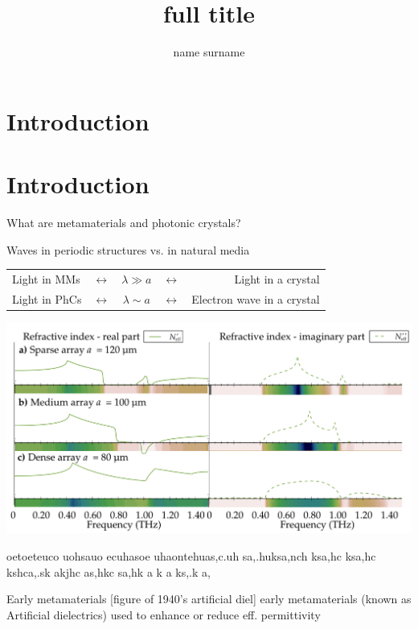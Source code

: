 \documentclass[t]{beamer} \usepackage[czech]{babel} \usepackage[utf8]{inputenc} \usetheme{Frankfurt} %
\title[short title]{full title}
\author{name surname} \institute{} \date{}
\begin{document}
\section{Introduction}

\begin{frame}		%
	\titlepage
\end{frame}		%
\section{Introduction}

\begin{frame}{What are metamaterials and photonic crystals?}	%

\begin{exampleblock}{Waves in periodic structures vs. in natural media}
\centering \begin{tabular}{lcccr}
Light in MMs    &$\leftrightarrow$  &$\lambda \gg a$ &$\leftrightarrow$ 	& Light in a crystal         	\\
Light in PhCs   &$\leftrightarrow$  &$\lambda \sim a$ &$\leftrightarrow$ 	& Electron wave in a crystal 	\\
\end{tabular}
\end{exampleblock}


\includegraphics[width=1.\framewidth]{../img/ERods_sketch_of_separate_spectra_to_continuous_scan.pdf}

oetoeteuco uohsauo ecuhasoe uhaontehuas,c.uh sa,.huksa,nch ksa,hc ksa,hc kshca,.sk akjhc as,hkc sa,hk a
k a ks,.k a,
\end{frame} 		%


\begin{frame}{Early metamaterials} 		%
[figure of 1940's artificial diel] early metamaterials (known as Artificial dielectrics) used to enhance or reduce eff. permittivity 
\end{frame} 		%
\end{document}
